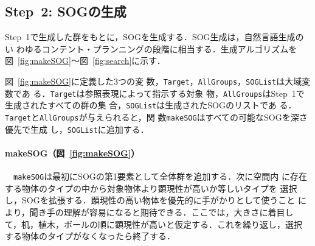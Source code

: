 \documentclass[japanese]{jnlp_1.2}
\begin{document}
\subsection*{Step~2: SOGの生成}\label{subsec:MakeSOG}

Step~1で生成した群をもとに，SOGを生成する．SOG生成は，自然言語生成のい
わゆるコンテント・プランニングの段階に相当する．生成アルゴリズムを
図~\ref{fig:makeSOG}〜図~\ref{fig:search}に示す．

図~\ref{fig:makeSOG}に定義した3つの変
数，\texttt{Target}，\texttt{AllGroups}，\texttt{SOGList}は大域変数であ
る．\texttt{Target}は参照表現によって指示する対象
物，\texttt{AllGroups}はStep~1で生成されたすべての群の集
合，\texttt{SOGList}は生成されたSOGのリストであ
る．\texttt{Target}と\texttt{AllGroups}が与えられると，関
数\texttt{makeSOG}はすべての可能なSOGを深さ優先で生成
し，\texttt{SOGList}に追加する．


\paragraph{makeSOG（図~\ref{fig:makeSOG}）}
　\texttt{makeSOG}は最初にSOGの第1要素として全体群を追加する．次に空間内
に存在する物体のタイプの中から対象物体より顕現性が高いか等しいタイプを
選択し，SOGを拡張する．顕現性の高い物体を優先的に手がかりとして使うこと
により，聞き手の理解が容易になると期待できる．ここでは，大きさに着目し
て，机，植木，ボールの順に顕現性が高いと仮定する．これを繰り返し，選択
する物体のタイプがなくなったら終了する．
\end{document}

